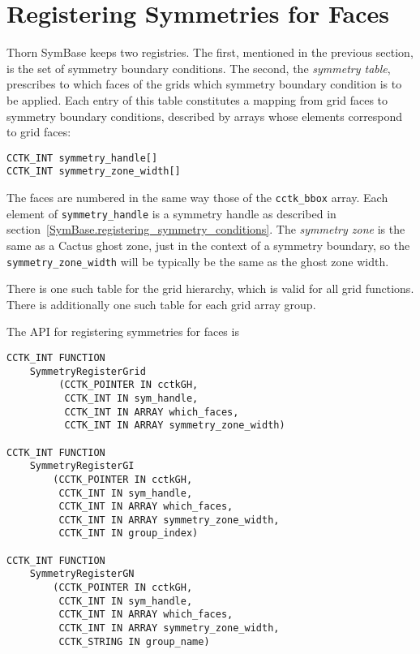 \section{Registering Symmetries for Faces}

Thorn SymBase keeps two registries.  The first, mentioned in the
previous section, is the set of symmetry boundary conditions. 
The second, the \emph{symmetry table}, prescribes to which faces
of the grids which symmetry boundary condition is to be applied.
Each entry of this table constitutes a mapping from grid faces to
symmetry boundary conditions, described by arrays whose elements
correspond to grid faces:

\begin{verbatim}
CCTK_INT symmetry_handle[]
CCTK_INT symmetry_zone_width[]
\end{verbatim}

The faces are numbered in the same way those of the \texttt{cctk\_bbox} array. 
Each element of \texttt{symmetry\_handle} is a symmetry handle as
described in section~\ref{SymBase.registering_symmetry_conditions}. 
The \emph{symmetry zone} is the same as a Cactus ghost zone, just in the
context of a symmetry boundary, so the \texttt{symmetry\_zone\_width} will
be typically be the same as the ghost zone width.


There is one such table for the grid hierarchy, which is valid for all
grid functions.  There is additionally one such table for each grid
array group.

The API for registering symmetries for faces is

\begin{verbatim}
CCTK_INT FUNCTION
    SymmetryRegisterGrid
         (CCTK_POINTER IN cctkGH,
          CCTK_INT IN sym_handle,
          CCTK_INT IN ARRAY which_faces,
          CCTK_INT IN ARRAY symmetry_zone_width)

CCTK_INT FUNCTION
    SymmetryRegisterGI
        (CCTK_POINTER IN cctkGH,
         CCTK_INT IN sym_handle,
         CCTK_INT IN ARRAY which_faces,
         CCTK_INT IN ARRAY symmetry_zone_width,
         CCTK_INT IN group_index)

CCTK_INT FUNCTION
    SymmetryRegisterGN
        (CCTK_POINTER IN cctkGH,
         CCTK_INT IN sym_handle,
         CCTK_INT IN ARRAY which_faces,
         CCTK_INT IN ARRAY symmetry_zone_width,
         CCTK_STRING IN group_name)
\end{verbatim}

